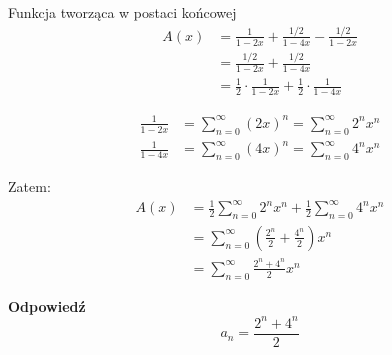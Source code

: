 \documentclass{mwart}
\begin{document}
\begin{mdframed}
    Funkcja tworząca w postaci końcowej
    \begin{align}
    A(x) &= \frac{1}{1-2x} + \frac{1/2}{1-4x} - \frac{1/2}{1-2x} \\
    &= \frac{1/2}{1-2x} + \frac{1/2}{1-4x} \\
    &= \frac{1}{2} \cdot \frac{1}{1-2x} + \frac{1}{2} \cdot \frac{1}{1-4x}
    \end{align}

    \begin{align}
    \frac{1}{1-2x} &= \sum_{n=0}^{\infty} (2x)^n = \sum_{n=0}^{\infty} 2^n x^n \\
    \frac{1}{1-4x} &= \sum_{n=0}^{\infty} (4x)^n = \sum_{n=0}^{\infty} 4^n x^n
    \end{align}
        
    Zatem:
    \begin{align}
    A(x) &= \frac{1}{2}\sum_{n=0}^{\infty} 2^n x^n + \frac{1}{2}\sum_{n=0}^{\infty} 4^n x^n \\
    &= \sum_{n=0}^{\infty} \left(\frac{2^n}{2} + \frac{4^n}{2}\right) x^n \\
    &= \sum_{n=0}^{\infty} \frac{2^n + 4^n}{2} x^n
    \end{align}
        
    \textbf{Odpowiedź}
    \begin{equation}
    \boxed{a_n = \frac{2^n + 4^n}{2}}
    \end{equation}
    
\end{mdframed}
\end{document}
